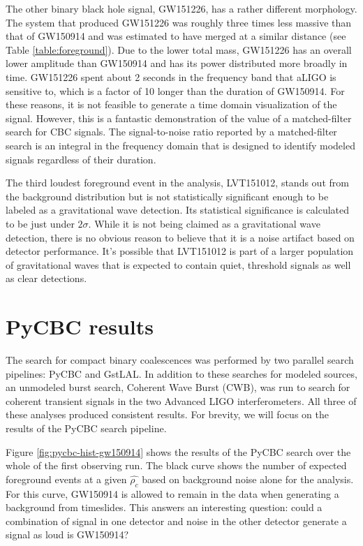 The other binary black hole signal, GW151226, has a rather different 
morphology. The system that produced GW151226 was roughly three times 
less massive than that of GW150914 and was estimated to have merged 
at a similar distance (see Table \ref{table:foreground}). Due to the 
lower total mass, GW151226 has an overall lower amplitude than GW150914 
and has its power distributed more broadly in time. GW151226 spent about 
2 seconds in the frequency band that aLIGO is sensitive to, which is a 
factor of 10 longer than the duration of GW150914. For these reasons, 
it is not feasible to generate a time domain visualization of the signal. 
However, this is a fantastic demonstration of the value of a 
matched-filter search for CBC signals. The signal-to-noise ratio 
reported by a matched-filter search is an 
integral in the frequency domain that is designed to identify modeled 
signals regardless of their duration.

The third loudest foreground event in the analysis, LVT151012, stands out 
from the background distribution but is not statistically significant 
enough to be labeled as a gravitational wave detection. Its statistical 
significance is calculated to be just under $2\sigma$. While it is not 
being claimed as a gravitational wave detection, there is no obvious 
reason to believe that it is a noise artifact based on detector 
performance. It's possible that LVT151012 is part of a larger 
population of gravitational waves that is expected to contain 
quiet, threshold signals as well as clear detections.

\section{PyCBC results}

The search for compact binary
coalescences was performed by two parallel search pipelines: PyCBC and 
GstLAL. In addition to these searches for modeled sources, an unmodeled 
burst search, Coherent Wave Burst (CWB), was run to search for coherent 
transient signals in the two Advanced LIGO interferometers. 
All three of these analyses produced consistent results. 
For brevity, we will focus on the results of the PyCBC search pipeline.

Figure \ref{fig:pycbc-hist-gw150914} shows the results of the PyCBC search 
over the whole of the first observing run. The black curve shows the 
number of expected foreground events at a given $\hat{\rho_c}$ based on 
background noise alone for the analysis. For this curve, GW150914 is 
allowed to remain in the data when generating a background from timeslides. 
This answers an interesting question: could a combination of signal in 
one detector and noise in the other detector generate a signal as loud is 
GW150914?

